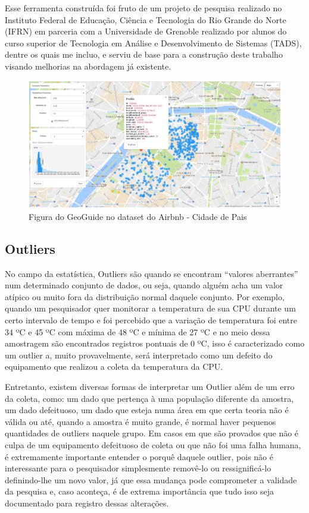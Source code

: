 Esse ferramenta construída foi fruto de um projeto de pesquisa realizado no Instituto Federal de Educação, Ciência e Tecnologia do Rio Grande do Norte (IFRN) em parceria com a Universidade de Grenoble realizado por alunos do curso superior de Tecnologia em Análise e Desenvolvimento de Sistemas (TADS), dentre os quais me incluo, e serviu de base para a construção deste trabalho visando melhorias na abordagem já existente.

\begin{figure}[t]
	\centering
	\includegraphics[width=\textwidth]{images/geoguide-example-airbnb}
	\caption{Figura do GeoGuide no dataset do Airbnb - Cidade de Pais}
	\label{fig:geoguide-example-airbnb}
	\vspace{-10pt}
\end{figure}

\subsection{Outliers}

No campo da estatística, Outliers são quando se encontram ``valores aberrantes'' num determinado conjunto de dados, ou seja, quando alguém acha um valor atípico ou muito fora da distribuição normal daquele conjunto. Por exemplo, quando um pesquisador quer monitorar a temperatura de sua CPU durante um certo intervalo de tempo e foi percebido que a variação de temperatura foi entre 34 ºC e 45 ºC com máxima de 48 ºC e mínima de 27 ºC e no meio dessa amostragem são encontrados registros pontuais de 0 ºC, isso é caracterizado como um outlier a, muito provavelmente, será interpretado como um defeito do equipamento que realizou a coleta da temperatura da CPU.

Entretanto, existem diversas formas de interpretar um Outlier além de um erro da coleta, como: um dado que pertença à uma população diferente da amostra, um dado defeituoso, um dado que esteja numa área em que certa teoria não é válida ou até, quando a amostra é muito grande, é normal haver pequenos quantidades de outliers naquele grupo. Em casos em que são provados que não é culpa de um equipamento defeituoso de coleta ou que não foi uma falha humana, é extremamente importante entender o porquê daquele outlier, pois não é interessante para o pesquisador simplesmente removê-lo ou ressignificá-lo definindo-lhe um novo valor, já que essa mudança pode comprometer a validade da pesquisa e, caso aconteça, é de extrema importância que tudo isso seja documentado para registro dessas alterações.

